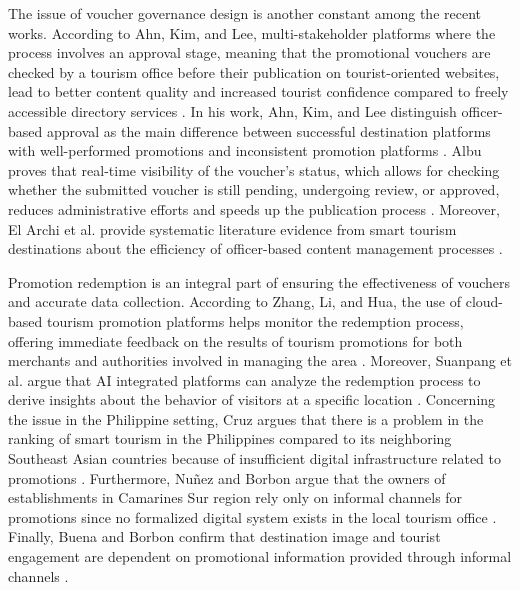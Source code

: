 \documentclass{research}
\begin{document}
The issue of voucher governance design is another constant among the recent works. According to Ahn, Kim, and Lee, multi-stakeholder platforms where the process involves an approval stage, meaning that the promotional vouchers are checked by a tourism office before their publication on tourist-oriented websites, lead to better content quality and increased tourist confidence compared to freely accessible directory services \cite{ahn2022}. In his work, Ahn, Kim, and Lee distinguish officer-based approval as the main difference between successful destination platforms with well-performed promotions and inconsistent promotion platforms \cite{ahn2022}. Albu proves that real-time visibility of the voucher's status, which allows for checking whether the submitted voucher is still pending, undergoing review, or approved, reduces administrative efforts and speeds up the publication process \cite{albu2025}. Moreover, El Archi et al. provide systematic literature evidence from smart tourism destinations about the efficiency of officer-based content management processes \cite{elarchi2023}.

Promotion redemption is an integral part of ensuring the effectiveness of vouchers and accurate data collection. According to Zhang, Li, and Hua, the use of cloud-based tourism promotion platforms helps monitor the redemption process, offering immediate feedback on the results of tourism promotions for both merchants and authorities involved in managing the area \cite{zhang2022}. Moreover, Suanpang et al. argue that AI integrated platforms can analyze the redemption process to derive insights about the behavior of visitors at a specific location \cite{suanpang2024}. Concerning the issue in the Philippine setting, Cruz argues that there is a problem in the ranking of smart tourism in the Philippines compared to its neighboring Southeast Asian countries because of insufficient digital infrastructure related to promotions \cite{cruz2024}. Furthermore, Nuñez and Borbon argue that the owners of establishments in Camarines Sur region rely only on informal channels for promotions since no formalized digital system exists in the local tourism office \cite{nunez2022}. Finally, Buena and Borbon confirm that destination image and tourist engagement are dependent on promotional information provided through informal channels \cite{buena2022}.
\end{document}
